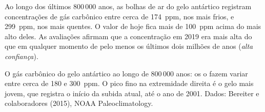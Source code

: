 \begin{proposition}\label{prop:g12:climate-change:icecore}
Ao longo dos últimos 800\,000 anos, as bolhas de ar do gelo antártico
registram concentrações de gás carbônico entre cerca de \qty{174}{ppm}, nos
 mais frios, e \qty{299}{ppm}, nos  mais
quentes. O valor de hoje fica mais de \qty{100}{ppm} acima do mais alto
deles. As avaliações afirmam que a concentração em 2019 era mais alta do que
em qualquer momento de pelo menos os últimos dois milhões de anos
(\emph{alta confiança}).
\end{proposition}

\begin{omfigure}

{\small O gás carbônico do gelo antártico ao longo de 800\,000 anos: os
 o fazem variar entre cerca de 180 e \qty{300}{ppm}. O pico
fino na extremidade direita é o gelo mais jovem, que registra o início da
subida atual, até o ano de 2001. Dados: Bereiter e colaboradores (2015),
NOAA Paleoclimatology.}
\end{omfigure}

